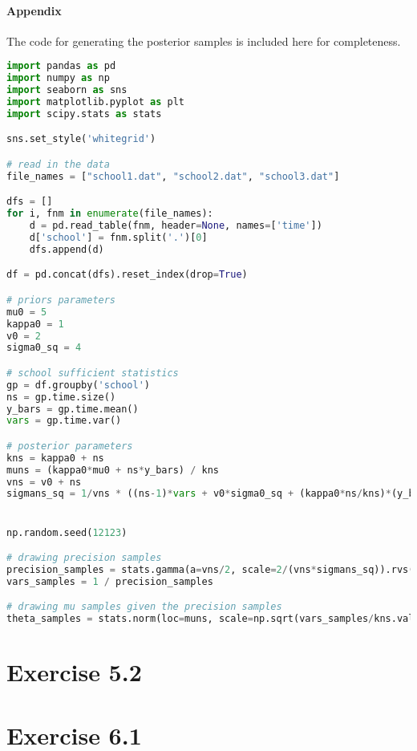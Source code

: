 \documentclass[11pt, letterpaper]{article}
\begin{document}
\paragraph{Appendix}
The code for generating the posterior samples is included here for completeness.
\begin{lstlisting}[language=Python]
import pandas as pd
import numpy as np
import seaborn as sns
import matplotlib.pyplot as plt
import scipy.stats as stats

sns.set_style('whitegrid')

# read in the data
file_names = ["school1.dat", "school2.dat", "school3.dat"]

dfs = []
for i, fnm in enumerate(file_names):
    d = pd.read_table(fnm, header=None, names=['time'])
    d['school'] = fnm.split('.')[0]
    dfs.append(d)

df = pd.concat(dfs).reset_index(drop=True)

# priors parameters
mu0 = 5
kappa0 = 1
v0 = 2
sigma0_sq = 4

# school sufficient statistics
gp = df.groupby('school')
ns = gp.time.size()
y_bars = gp.time.mean()
vars = gp.time.var()

# posterior parameters
kns = kappa0 + ns
muns = (kappa0*mu0 + ns*y_bars) / kns
vns = v0 + ns
sigmans_sq = 1/vns * ((ns-1)*vars + v0*sigma0_sq + (kappa0*ns/kns)*(y_bars-mu0)**2)


np.random.seed(12123)

# drawing precision samples
precision_samples = stats.gamma(a=vns/2, scale=2/(vns*sigmans_sq)).rvs(size=(100000, 3))
vars_samples = 1 / precision_samples

# drawing mu samples given the precision samples
theta_samples = stats.norm(loc=muns, scale=np.sqrt(vars_samples/kns.values)).rvs()
\end{lstlisting}


\section{Exercise 5.2}
\section{Exercise 6.1}
\end{document}

